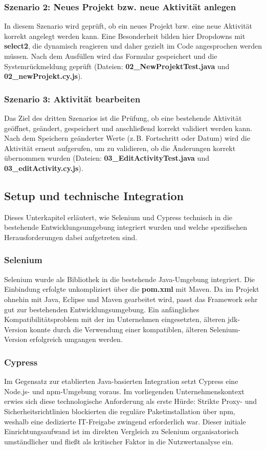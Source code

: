 \subsubsection{Szenario 2: Neues Projekt bzw. neue Aktivität anlegen}
In diesem Szenario wird geprüft, ob ein neues Projekt bzw. eine neue Aktivität korrekt angelegt werden kann. Eine Besonderheit bilden hier Dropdowns mit \textbf{select2}, die dynamisch reagieren und daher gezielt im Code angesprochen werden müssen. 
Nach dem Ausfüllen wird das Formular gespeichert und die Systemrückmeldung geprüft (Dateien: \textbf{02\_NewProjektTest.java} und \textbf{02\_newProjekt.cy.js}).

\subsubsection{Szenario 3: Aktivität bearbeiten}
Das Ziel des dritten Szenarios ist die Prüfung, ob eine bestehende Aktivität geöffnet, geändert, gespeichert und anschließend korrekt validiert werden kann. Nach dem Speichern geänderter Werte (z.\,B. Fortschritt oder Datum) wird die Aktivität erneut aufgerufen, um zu validieren, ob die Änderungen korrekt übernommen wurden (Dateien: \textbf{03\_EditActivityTest.java} und \textbf{03\_editActivity.cy.js}).


\subsection{Setup und technische Integration}
\label{sec:setup}

Dieses Unterkapitel erläutert, wie Selenium und Cypress technisch in die bestehende Entwicklungsumgebung integriert wurden und welche spezifischen Herausforderungen dabei aufgetreten sind.

\subsubsection{Selenium}
Selenium wurde als Bibliothek in die bestehende Java-Umgebung integriert. Die Einbindung erfolgte unkompliziert über die \textbf{pom.xml} mit Maven. Da im Projekt ohnehin mit Java, Eclipse und Maven gearbeitet wird, passt das Framework sehr gut zur bestehenden Entwicklungsumgebung. Ein anfängliches Kompatibilitätsproblem mit der im Unternehmen eingesetzten, älteren \gls{jdk}-Version konnte durch die Verwendung einer kompatiblen, älteren Selenium-Version erfolgreich umgangen werden.
\subsubsection{Cypress}
Im Gegensatz zur etablierten Java-basierten Integration setzt Cypress eine Node.js- und npm-Umgebung voraus. Im vorliegenden Unternehmenskontext erwies sich diese technologische Anforderung als erste Hürde: Strikte Proxy- und Sicherheitsrichtlinien blockierten die reguläre Paketinstallation über npm, weshalb eine dedizierte IT-Freigabe zwingend erforderlich war. Dieser initiale Einrichtungsaufwand ist im direkten Vergleich zu Selenium organisatorisch umständlicher und fließt als kritischer Faktor in die Nutzwertanalyse ein.


